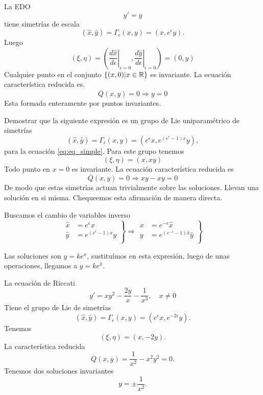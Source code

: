 \begin{ejemplo} La EDO
\begin{equation}\label{eq:eq_simple}y'=y
 \end{equation}
tiene simetrías de escala
\[(\hat{x},\hat{y})=\Gamma_{\epsilon}(x,y)=(x,e^{\epsilon}y).
 \]
Luego 
\[(\xi,\eta)=\left(\left.\frac{d\hat{x}}{d\epsilon}\right|_{\epsilon=0}, \left.\frac{d\hat{y}}{d\epsilon}\right|_{\epsilon=0}   \right)=(0,y)\]
Cualquier punto en el conjunto $\{(x,0)|x\in\mathbb{R}\}$  es invariante. La ecuación característica reducida es.
\[\overline{Q}(x,y)=0\Rightarrow y=0\]
Esta formada enteramente por puntos invariantes.
\end{ejemplo}



\begin{ejemplo}\actividad Demostrar que la siguiente expresión es un grupo de Lie uniparamétrico de simetrías
\[(\hat{x},\hat{y})=\Gamma_{\epsilon}(x,y)=(e^{\epsilon}x,e^{(e^{\epsilon}-1)x}y),\]
para la ecuación \eqref{eq:eq_simple}.
Para este grupo tenemos
\[(\xi,\eta)=(x,xy)\]
Todo punto en $x=0$ es invariante. La ecuación característica reducida es
\[\overline{Q}(x,y)=0\Rightarrow xy-xy=0\]
De modo que estas simetrías actuan trivialmente sobre las soluciones. Llevan una solución en si misma. Chequeemos esta afirmación de manera directa. 
\end{ejemplo}

Buscamos el cambio de variables inverso
\[
\left.
\begin{array}{ll} 
  \hat{x}&= e^{\epsilon}x\\
  \hat{y}&=e^{(e^{\epsilon}-1)x}y\\
\end{array}
\right\} 
\Rightarrow  
    \left.
\begin{array}{ll} 
  x&= e^{-\epsilon}\hat{x}\\
  y&=e^{(e^{-\epsilon}-1)\hat{x}}\hat{y}\\
\end{array}
\right\} 
\]    

Las soluciones son $y=ke^x$, sustituímos en esta expresión, luego de unas operaciones, llegamos a $\hat{y}=ke^{\hat{x}}$.

\begin{ejemplo} La ecuación de Riccati
\[y'=xy^2-\frac{2y}{x}-\frac{1}{x^3},\quad x\neq 0\] 
 Tiene el grupo de Lie de simetrías
\[(\hat{x},\hat{y})=\Gamma_{\epsilon}(x,y)=(e^{\epsilon}x,e^{-2\epsilon}y).\]
Tenemos
\[(\xi,\eta)=(x,-2y).\]
La característica reducida
\[\overline{Q}(x,y)=\frac{1}{x^2}-x^2y^2=0.\]
Tenemos dos soluciones invariantes
\[y=\pm\frac{1}{x^2}.\] 

\end{ejemplo}

